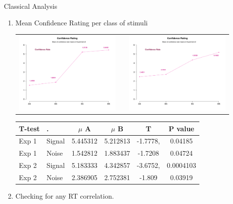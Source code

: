 \documentclass[final]{beamer}
\newlength{\sepwid}
\newlength{\onecolwid}
\newlength{\twocolwid}
\begin{document}
\begin{frame}[t]
\begin{columns}[t]
\begin{column}{\twocolwid}
\begin{columns}[t,totalwidth=\twocolwid]
\begin{column}{\onecolwid}
\begin{alertblock}{Classical Analysis}
\begin{enumerate}
\item Mean Confidence Rating per class of stimuli
\begin{center}
\begin{tabular}{ccc}
\includegraphics[width=0.4\linewidth]{Figures/MirrorConfidence_1.pdf} & \hfill & \includegraphics[width=0.4\linewidth]{Figures/MirrorConfidence_2.pdf}
\end{tabular}
\end{center}
\begin{table}
\vspace{3ex}
\begin{tabular}{l l |  c c c c}
\toprule
\textbf{T-test} & \textbf{.} & \textbf{$\mu$ A} & \textbf{$\mu$ B} & \textbf{T} & \textbf{P value}\\
\midrule
Exp 1 & Signal & 5.445312 & 5.212813 & -1.7778, & 0.04185 \\
Exp 1 & Noise & 1.542812 & 1.883437 & -1.7208 & 0.04724 \\
Exp 2 & Signal & 5.183333 & 4.342857  & -3.6752, & 0.0004103 \\
Exp 2 & Noise & 2.386905 & 2.752381 & -1.809 & 0.03919 \\
\bottomrule
\end{tabular}
\end{table}
\item Checking for any RT correlation.
\end{enumerate}
\end{alertblock}
\end{column} %

\begin{column}{\sepwid}\end{column} %
\begin{column}{\onecolwid}\vspace{-2.1in} %



\end{column}
\end{columns}
\end{column}
\end{columns}
\end{frame}
\end{document}
